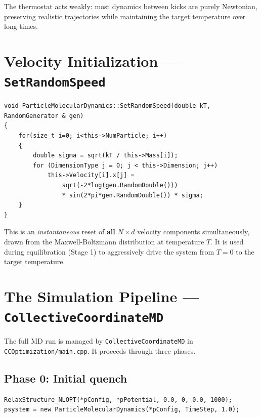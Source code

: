 \documentclass[12pt,a4paper]{article}
\begin{document}
The thermostat acts weakly: most dynamics between kicks are purely Newtonian,
preserving realistic trajectories while maintaining the target temperature
over long times.

\section{Velocity Initialization --- \texttt{SetRandomSpeed}}

\begin{lstlisting}
void ParticleMolecularDynamics::SetRandomSpeed(double kT, RandomGenerator & gen)
{
    for(size_t i=0; i<this->NumParticle; i++)
    {
        double sigma = sqrt(kT / this->Mass[i]);
        for (DimensionType j = 0; j < this->Dimension; j++)
            this->Velocity[i].x[j] =
                sqrt(-2*log(gen.RandomDouble()))
                * sin(2*pi*gen.RandomDouble()) * sigma;
    }
}
\end{lstlisting}

This is an \emph{instantaneous} reset of \textbf{all} $N \times d$ velocity
components simultaneously, drawn from the Maxwell-Boltzmann distribution
at temperature $T$. It is used during equilibration (Stage 1) to aggressively
drive the system from $T=0$ to the target temperature.

\section{The Simulation Pipeline --- \texttt{CollectiveCoordinateMD}}

The full MD run is managed by \texttt{CollectiveCoordinateMD} in
\texttt{CCOptimization/main.cpp}. It proceeds through three phases.

\subsection{Phase 0: Initial quench}

\begin{lstlisting}
RelaxStructure_NLOPT(*pConfig, *pPotential, 0.0, 0, 0.0, 1000);
psystem = new ParticleMolecularDynamics(*pConfig, TimeStep, 1.0);
\end{lstlisting}
\end{document}
